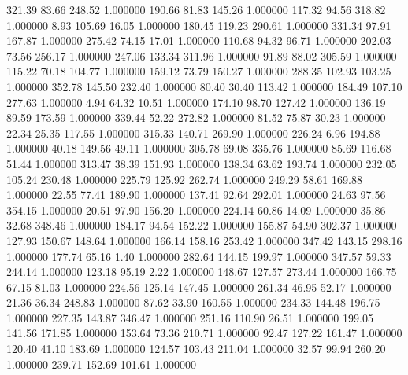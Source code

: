     321.39     83.66    248.52  1.000000
    190.66     81.83    145.26  1.000000
    117.32     94.56    318.82  1.000000
      8.93    105.69     16.05  1.000000
    180.45    119.23    290.61  1.000000
    331.34     97.91    167.87  1.000000
    275.42     74.15     17.01  1.000000
    110.68     94.32     96.71  1.000000
    202.03     73.56    256.17  1.000000
    247.06    133.34    311.96  1.000000
     91.89     88.02    305.59  1.000000
    115.22     70.18    104.77  1.000000
    159.12     73.79    150.27  1.000000
    288.35    102.93    103.25  1.000000
    352.78    145.50    232.40  1.000000
     80.40     30.40    113.42  1.000000
    184.49    107.10    277.63  1.000000
      4.94     64.32     10.51  1.000000
    174.10     98.70    127.42  1.000000
    136.19     89.59    173.59  1.000000
    339.44     52.22    272.82  1.000000
     81.52     75.87     30.23  1.000000
     22.34     25.35    117.55  1.000000
    315.33    140.71    269.90  1.000000
    226.24      6.96    194.88  1.000000
     40.18    149.56     49.11  1.000000
    305.78     69.08    335.76  1.000000
     85.69    116.68     51.44  1.000000
    313.47     38.39    151.93  1.000000
    138.34     63.62    193.74  1.000000
    232.05    105.24    230.48  1.000000
    225.79    125.92    262.74  1.000000
    249.29     58.61    169.88  1.000000
     22.55     77.41    189.90  1.000000
    137.41     92.64    292.01  1.000000
     24.63     97.56    354.15  1.000000
     20.51     97.90    156.20  1.000000
    224.14     60.86     14.09  1.000000
     35.86     32.68    348.46  1.000000
    184.17     94.54    152.22  1.000000
    155.87     54.90    302.37  1.000000
    127.93    150.67    148.64  1.000000
    166.14    158.16    253.42  1.000000
    347.42    143.15    298.16  1.000000
    177.74     65.16      1.40  1.000000
    282.64    144.15    199.97  1.000000
    347.57     59.33    244.14  1.000000
    123.18     95.19      2.22  1.000000
    148.67    127.57    273.44  1.000000
    166.75     67.15     81.03  1.000000
    224.56    125.14    147.45  1.000000
    261.34     46.95     52.17  1.000000
     21.36     36.34    248.83  1.000000
     87.62     33.90    160.55  1.000000
    234.33    144.48    196.75  1.000000
    227.35    143.87    346.47  1.000000
    251.16    110.90     26.51  1.000000
    199.05    141.56    171.85  1.000000
    153.64     73.36    210.71  1.000000
     92.47    127.22    161.47  1.000000
    120.40     41.10    183.69  1.000000
    124.57    103.43    211.04  1.000000
     32.57     99.94    260.20  1.000000
    239.71    152.69    101.61  1.000000
